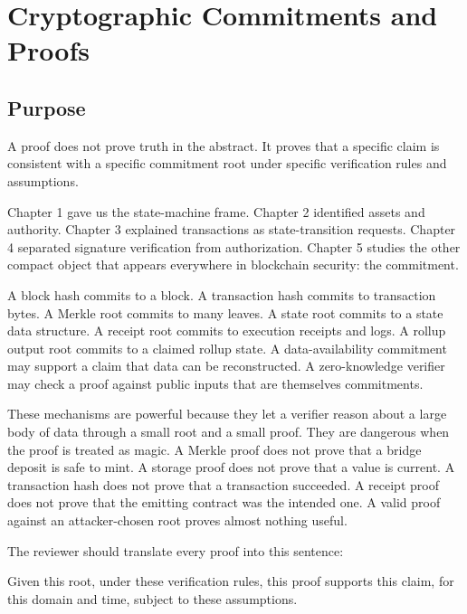 \chapter{Cryptographic Commitments and Proofs}

\section{Purpose}

\begin{principlebox}
A proof does not prove truth in the abstract. It proves that a specific claim is consistent with a specific commitment root under specific verification rules and assumptions.
\end{principlebox}

Chapter 1 gave us the state-machine frame. Chapter 2 identified assets and authority. Chapter 3 explained transactions as state-transition requests. Chapter 4 separated signature verification from authorization. Chapter 5 studies the other compact object that appears everywhere in blockchain security: the commitment.

A block hash commits to a block. A transaction hash commits to transaction bytes. A Merkle root commits to many leaves. A state root commits to a state data structure. A receipt root commits to execution receipts and logs. A rollup output root commits to a claimed rollup state. A data-availability commitment may support a claim that data can be reconstructed. A zero-knowledge verifier may check a proof against public inputs that are themselves commitments.

These mechanisms are powerful because they let a verifier reason about a large body of data through a small root and a small proof. They are dangerous when the proof is treated as magic. A Merkle proof does not prove that a bridge deposit is safe to mint. A storage proof does not prove that a value is current. A transaction hash does not prove that a transaction succeeded. A receipt proof does not prove that the emitting contract was the intended one. A valid proof against an attacker-chosen root proves almost nothing useful.

The reviewer should translate every proof into this sentence:

\begin{codeblock}
Given this root,
under these verification rules,
this proof supports this claim,
for this domain and time,
subject to these assumptions.
\end{codeblock}

